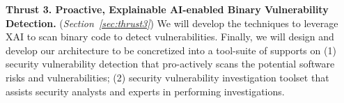 \noindent \textbf{Thrust 3. Proactive, Explainable AI-enabled Binary
  Vulnerability Detection.} ({\em Section~\ref{sec:thrust3}}) We will
develop the techniques to leverage XAI to scan binary code to detect
vulnerabilities. Finally, we will design and develop our architecture
to be concretized into a tool-suite of supports on (1) security
vulnerability detection that pro-actively scans the potential software
risks and vulnerabilities; (2) security vulnerability investigation
toolset that assists security analysts and experts in performing
investigations.








